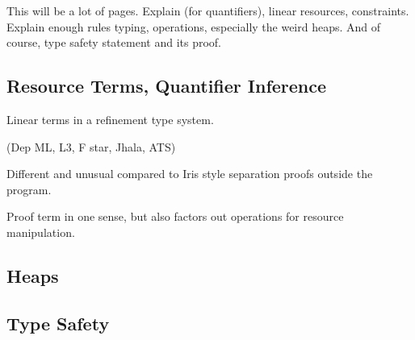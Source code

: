 This will be a lot of pages.
Explain  (for quantifiers), linear resources, constraints.
Explain enough rules \textemdash{} typing, operations, especially the weird heaps.
And of course, type safety statement and its proof.

\subsection{Resource Terms, Quantifier Inference}

Linear terms in a refinement type system.

(Dep ML, L3, F star, Jhala, ATS)

Different and unusual compared to Iris style \textemdash{} separation proofs outside the program.

Proof term in one sense, but also factors out operations for resource manipulation.

\subsection{Heaps}


\subsection{Type Safety}


